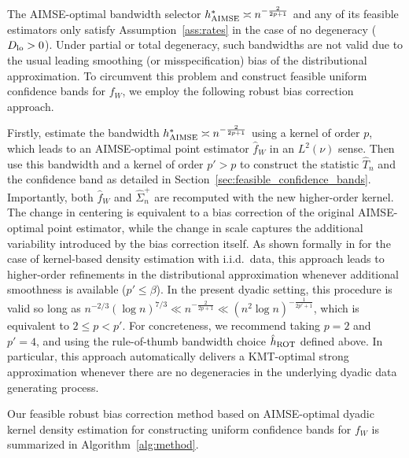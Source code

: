 The AIMSE-optimal bandwidth selector $h^*_{\operatorname{AIMSE}}\asymp n^{-\frac{2}{2p+1}}$
and any of its feasible estimators only satisfy Assumption~\ref{ass:rates} in
the case of no degeneracy ($D_{\textup{lo}}>0$). Under partial or total degeneracy, such
bandwidths are not valid due to the usual leading smoothing (or
misspecification) bias of the distributional approximation. To circumvent this
problem and construct feasible uniform confidence bands for $f_W$, we employ
the following robust bias correction approach.

Firstly, estimate the bandwidth $h^*_{\operatorname{AIMSE}}\asymp n^{-\frac{2}{2p+1}}$ using a
kernel of order $p$, which leads to an AIMSE-optimal point estimator
$\hat{f}_W$ in an $L^2(\nu)$ sense. Then use this bandwidth and a kernel of
order $p' > p$ to construct the statistic $\hat T_n$ and the confidence band as
detailed in Section~\ref{sec:feasible_confidence_bands}. Importantly, both
$\hat{f}_W$ and $\hat{\Sigma}^+_n$ are recomputed with the new higher-order
kernel. The change in centering is equivalent to a bias correction of the
original AIMSE-optimal point estimator, while the change in scale captures the
additional variability introduced by the bias correction itself. As shown
formally in \citet{calonico2018effect, calonico2022coverage} for the case of
kernel-based density
estimation with i.i.d.\ data, this approach leads to higher-order refinements
in the distributional approximation whenever additional smoothness is available
($p'\leq\beta$). In the present dyadic setting, this procedure is valid so long
as $n^{-2/3} (\log n)^{7/3} \ll n^{-\frac{2}{2p+1}}
\ll (n^2 \log n)^{-\frac{1}{2p' + 1}}$,
which is equivalent to $2 \leq p < p'$.
For concreteness, we recommend taking $p = 2$ and $p' = 4$,
and using the rule-of-thumb bandwidth choice $\hat{h}_{\operatorname{ROT}}$ defined above.
In particular, this approach automatically delivers a KMT-optimal
strong approximation whenever there are no degeneracies in the
underlying dyadic data generating process.

Our feasible robust bias correction method based on AIMSE-optimal dyadic
kernel density estimation for constructing uniform confidence bands
for $f_W$ is summarized in Algorithm~\ref{alg:method}.

